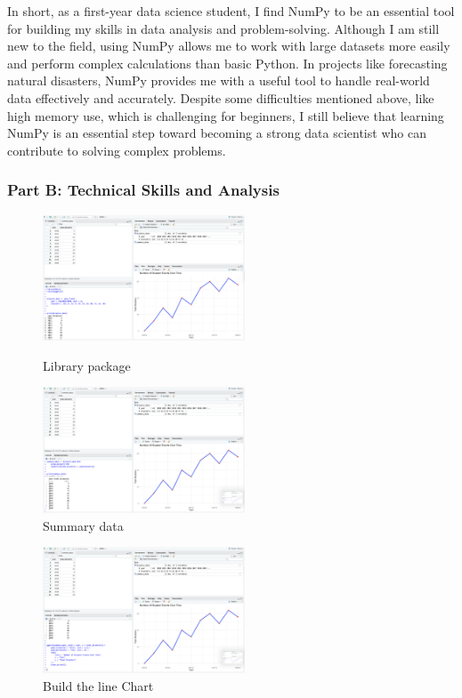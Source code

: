 \documentclass[a4paper, 11pt]{report}
\begin{document}
In short, as a first-year data science student, I find NumPy to be an essential tool for building my skills in data analysis and problem-solving. Although I am still new to the field, using NumPy allows me to work with large datasets more easily and perform complex calculations than basic Python. In projects like forecasting natural disasters, NumPy provides me with a useful tool to handle real-world data effectively and accurately. Despite some difficulties mentioned above, like high memory use, which is challenging for beginners, I still believe that learning NumPy is an essential step toward becoming a strong data scientist who can contribute to solving complex problems.


\subsubsection{Part B: Technical Skills and Analysis}

\begin{figure}[htbp]
\centering
\begin{minipage}[t]{1.30\textwidth}
\centering
\includegraphics[width=6cm]{Rprogram1.png}
\caption{Library package}
\end{minipage}
\begin{minipage}[t]{1.30\textwidth}
\centering
\includegraphics[width=6cm]{Rprogram2.png}
\caption{Summary data}
\end{minipage}
\end{figure}

\begin{figure}[htbp]
\centering
\begin{minipage}[t]{1.30\textwidth}
\centering
\includegraphics[width=6cm]{Rprogram3.png}
\caption{Build the line Chart}
\end{minipage}
\end{figure}
\end{document}
